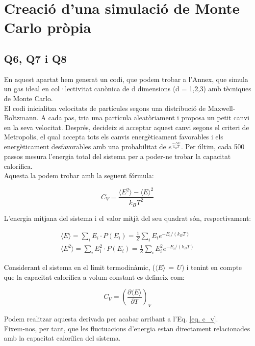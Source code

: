 \documentclass{article}
\begin{document}
	
	
	\section{Creació d'una simulació de Monte Carlo pròpia}
	\subsection*{Q6, Q7 i Q8}
	En aquest apartat hem generat un codi, que podem trobar a l'Annex, que simula un gas ideal en col·lectivitat canònica de d dimensions (d = 1,2,3) amb tècniques de Monte Carlo.
	\\
	El codi inicialitza velocitats de partícules segons una distribució de Maxwell-Boltzmann. A cada pas, tria una partícula aleatòriament i proposa un petit canvi en la seva velocitat. Després, decideix si acceptar aquest canvi segons el criteri de Metropolis, el qual accepta tots els canvis energèticament favorables i els energèticament desfavorables amb una probabilitat de $e^{\frac{-\Delta E}{k_BT}}$. Per últim, cada 500 passos mesura l'energia total del sistema per a poder-ne trobar la capacitat calorífica.
	\\
	Aquesta la podem trobar amb la següent fórmula:
	
	\begin{equation}
		C_V = \frac{\langle E^2 \rangle - \langle E \rangle^2}{k_B T^2}
		\label{eq. c_v}
	\end{equation}
	
	\noindent L'energia mitjana del sistema i el valor mitjà del seu quadrat són, respectivament:
	
	\begin{gather}
		\langle E \rangle = \sum_i E_i \cdot P(E_i)
		= \frac{1}{Z} \sum_i E_i e^{-E_i / (k_B T)}
		\\
		\langle E^2 \rangle = \sum_i E_i^2 \cdot P(E_i)
		= \frac{1}{Z} \sum_i E_i^2 e^{-E_i / (k_B T)}
	\end{gather}
	
	\noindent Considerant el sistema en el límit termodinàmic, ($\langle E \rangle  \, = \, U$) i tenint en compte que la capacitat calorífica a volum constant es defineix com:
	
	\begin{equation}
		C_V = \left( \frac{\partial \langle E \rangle}{\partial T} \right)_V
	\end{equation}
	
	\noindent Podem realitzar aquesta derivada per acabar arribant a l'Eq. \eqref{eq. c_v}.
	\\
	Fixem-nos, per tant, que les fluctuacions d'energia estan directament relacionades amb la capacitat calorífica del sistema.
	\\
	
\end{document}
